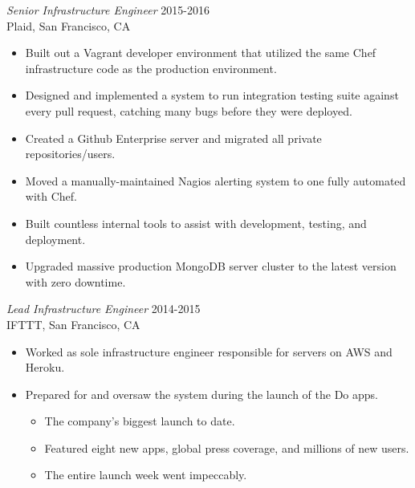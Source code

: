 \documentclass[line,margin]{res}
\begin{document}
\begin{resume}
  {\sl Senior Infrastructure Engineer}  \hfill 2015-2016 \\
  Plaid,
  San Francisco, CA
  \begin{itemize}  \itemsep -2pt %
    \item Built out a Vagrant developer environment that utilized the same Chef infrastructure code as the production environment.
    \item Designed and implemented a system to run integration testing suite against every pull request, catching many bugs before they were deployed.
    \item Created a Github Enterprise server and migrated all private repositories/users.
    \item Moved a manually-maintained Nagios alerting system to one fully automated with Chef.
    \item Built countless internal tools to assist with development, testing, and deployment.
    \item Upgraded massive production MongoDB server cluster to the latest version with zero downtime.
  \end{itemize}

  {\sl Lead Infrastructure Engineer}  \hfill 2014-2015 \\
  IFTTT,
  San Francisco, CA
  \begin{itemize}  \itemsep -2pt %
    \item Worked as sole infrastructure engineer responsible for servers on AWS and Heroku.
    \item Prepared for and oversaw the system during the launch of the Do apps.
 
    \vspace{-2.5mm} %
    \begin{itemize}  \itemsep -3pt %
      \item The company's biggest launch to date.
      \item Featured eight new apps, global press coverage, and millions of new users. 
      \item The entire launch week went impeccably.
    \end{itemize}
    \vspace{-2.0mm} %


\end{itemize}
\end{resume}
\end{document}
